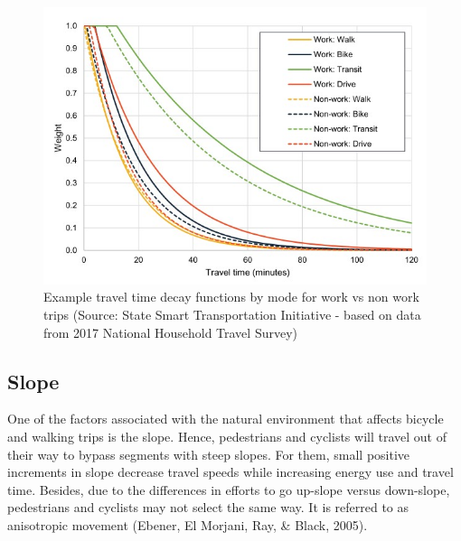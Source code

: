 \documentclass[
11pt, %
oneside, %
english, %
singlespacing, %
]{macthesis} %
\begin{document}
\begin{figure}

{\centering \includegraphics[width=1\linewidth]{figure/ch02-Fig-02} 

}

\caption{Example travel time decay functions by mode for work vs non work trips (Source: State Smart Transportation Initiative - based on data from 2017 National Household Travel Survey)}\label{fig:ch02-plot-fig-02}
\end{figure}

\subsection{Slope}\label{slope}

One of the factors associated with the natural environment that affects bicycle and walking trips is the slope. Hence, pedestrians and cyclists will travel out of their way to bypass segments with steep slopes. For them, small positive increments in slope decrease travel speeds while increasing energy use and travel time. Besides, due to the differences in efforts to go up-slope versus down-slope, pedestrians and cyclists may not select the same way. It is referred to as anisotropic movement (Ebener, El Morjani, Ray, \& Black, 2005).
\end{document}
